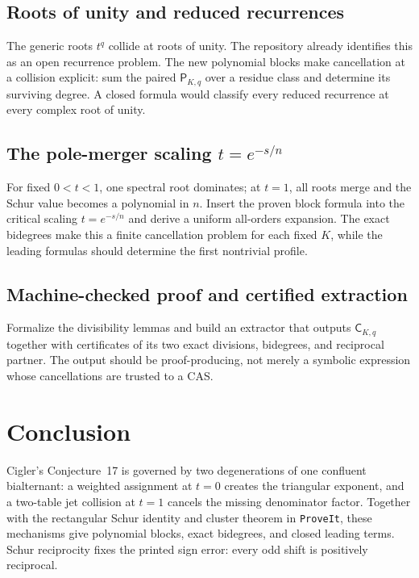 \documentclass[11pt]{article}
\theoremstyle{definition}
\theoremstyle{remark}
\newcommand{\Cblock}{\mathsf C}
\newcommand{\Pblock}{\mathsf P}
\theoremstyle{definition}
\theoremstyle{plain}
\numberwithin{equation}{section}
\begin{document}
\subsection{Roots of unity and reduced recurrences}
\label{sb:q:roots}
The generic roots $t^q$ collide at roots of unity.  The repository already
identifies this as an open recurrence problem.  The new polynomial blocks
make cancellation at a collision explicit: sum the paired
$\Pblock_{K,q}$ over a residue class and determine its surviving degree.
A closed formula would classify every reduced recurrence at every complex
root of unity.

\noindent[Added 30 September 2026, batch~70: answered. ``The repository
already identifies this as an open recurrence problem'' was true at the pin
(Part~II's Section~\ref{cp:sec:rs-cyclotomic}). Part~III, added afterwards,
classifies the reduced denominators and minimal recurrences at every root
of unity (Theorem~\ref{cp:thm:main}) and at every complex parameter
(Corollary~\ref{cp:cor:complex}), by summing the canonical polynomials
$P_{k,q}=\Pblock_{K,q}$ over a residue class as suggested here. It does not
use the blocks $\Cblock_{K,q}$; a derivation of its classification from the
block formula has not been written.]

\subsection{The pole-merger scaling \texorpdfstring{$t=e^{-s/n}$}{t = exp(-s/n)}}
\label{sb:q:merger}
For fixed $0<t<1$, one spectral root dominates; at $t=1$, all roots merge and
the Schur value becomes a polynomial in $n$.  Insert the proven block formula
into the critical scaling $t=e^{-s/n}$ and derive a uniform all-orders
expansion.  The exact bidegrees make this a finite cancellation problem for
each fixed $K$, while the leading formulas should determine the first
nontrivial profile.

\subsection{Machine-checked proof and certified extraction}
\label{sb:q:certified}
Formalize the divisibility lemmas and build an extractor that outputs
$\Cblock_{K,q}$ together with certificates of its two exact divisions,
bidegrees, and reciprocal partner.  The output should be proof-producing,
not merely a symbolic expression whose cancellations are trusted to a CAS.

\section{Conclusion}
Cigler's Conjecture~17 is governed by two degenerations of one confluent
bialternant: a weighted assignment at $t=0$ creates the triangular exponent,
and a two-table jet collision at $t=1$ cancels the missing denominator factor.
Together with the rectangular Schur identity and cluster theorem in
\texttt{ProveIt}, these mechanisms give polynomial blocks, exact bidegrees,
and closed leading terms.  Schur reciprocity fixes the printed sign error:
every odd shift is positively reciprocal.
\end{document}
